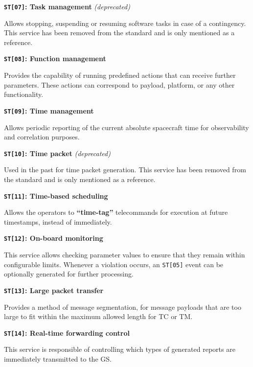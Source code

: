 \documentclass[a4paper,nobib]{tufte-book}
\begin{document}
\begin{compactitem}
	\item \textbf{\texttt{ST[07]}: Task management} \emph{(deprecated)}
	
	Allows stopping, suspending or resuming software tasks in case of a contingency. This service has been removed from the standard and is only mentioned as a reference.
	
	\item \textbf{\texttt{ST[08]}: Function management}
	
	Provides the capability of running predefined actions that can receive further parameters. These actions can correspond to payload, platform, or any other functionality.
	
	\pagebreak[4] %
	\item \textbf{\texttt{ST[09]}: Time management}
	
	Allows periodic reporting of the current absolute spacecraft time for observability and correlation purposes.
	
	\item \textbf{\texttt{ST[10]}: Time packet} \emph{(deprecated)}
	
	Used in the past for time packet generation. This service has been removed from the standard and is only mentioned as a reference.
	
	\item \textbf{\texttt{ST[11]}: Time-based scheduling}
	
	Allows the operators to \textbf{``time-tag''} telecommands for execution at future timestamps, instead of immediately.
	
	\item \textbf{\texttt{ST[12]}: On-board monitoring}
	
	This service allows checking parameter values to ensure that they remain within configurable limits. Whenever a violation occurs, an \texttt{ST[05]} event can be optionally generated for further processing.
	
	\item \textbf{\texttt{ST[13]}: Large packet transfer}
	
	Provides a method of message segmentation, for message payloads that are too large to fit within the maximum allowed length for \ac{TC} or \ac{TM}.
	
	\item \textbf{\texttt{ST[14]}: Real-time forwarding control}
	
	This service is responsible of controlling which types of generated reports are immediately transmitted to the \acl{GS}.
	

\end{compactitem}
\end{document}
